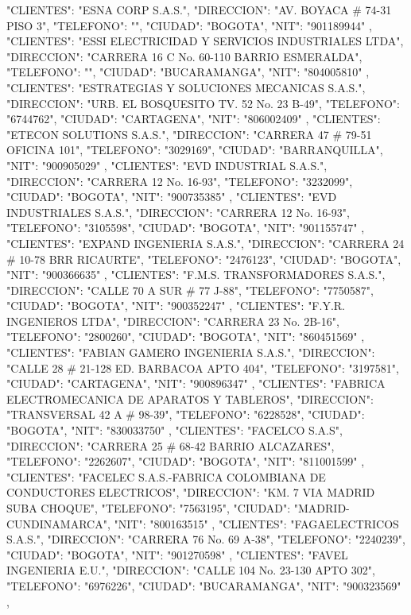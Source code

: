    {
   "CLIENTES": "ESNA CORP S.A.S.",
   "DIRECCION": "AV. BOYACA # 74-31 PISO 3",
   "TELEFONO": "",
   "CIUDAD": "BOGOTA",
   "NIT": "901189944"
   },
   {
   "CLIENTES": "ESSI ELECTRICIDAD Y SERVICIOS INDUSTRIALES LTDA",
   "DIRECCION": "CARRERA 16 C No. 60-110 BARRIO ESMERALDA",
   "TELEFONO": "",
   "CIUDAD": "BUCARAMANGA",
   "NIT": "804005810"
   },
   {
   "CLIENTES": "ESTRATEGIAS Y SOLUCIONES MECANICAS S.A.S.",
   "DIRECCION": "URB. EL BOSQUESITO TV. 52 No. 23 B-49",
   "TELEFONO": "6744762",
   "CIUDAD": "CARTAGENA",
   "NIT": "806002409"
   },
   {
   "CLIENTES": "ETECON SOLUTIONS S.A.S.",
   "DIRECCION": "CARRERA 47 # 79-51 OFICINA 101",
   "TELEFONO": "3029169",
   "CIUDAD": "BARRANQUILLA",
   "NIT": "900905029"
   },
   {
   "CLIENTES": "EVD INDUSTRIAL S.A.S.",
   "DIRECCION": "CARRERA 12 No. 16-93",
   "TELEFONO": "3232099",
   "CIUDAD": "BOGOTA",
   "NIT": "900735385"
   },
   {
   "CLIENTES": "EVD INDUSTRIALES S.A.S.",
   "DIRECCION": "CARRERA 12 No. 16-93",
   "TELEFONO": "3105598",
   "CIUDAD": "BOGOTA",
   "NIT": "901155747"
   },
   {
   "CLIENTES": "EXPAND INGENIERIA S.A.S.",
   "DIRECCION": "CARRERA 24 # 10-78 BRR RICAURTE",
   "TELEFONO": "2476123",
   "CIUDAD": "BOGOTA",
   "NIT": "900366635"
   },
   {
   "CLIENTES": "F.M.S. TRANSFORMADORES S.A.S.",
   "DIRECCION": "CALLE 70 A SUR # 77 J-88",
   "TELEFONO": "7750587",
   "CIUDAD": "BOGOTA",
   "NIT": "900352247"
   },
   {
   "CLIENTES": "F.Y.R. INGENIEROS LTDA",
   "DIRECCION": "CARRERA 23 No. 2B-16",
   "TELEFONO": "2800260",
   "CIUDAD": "BOGOTA",
   "NIT": "860451569"
   },
   {
   "CLIENTES": "FABIAN GAMERO INGENIERIA S.A.S.",
   "DIRECCION": "CALLE 28 # 21-128 ED. BARBACOA APTO 404",
   "TELEFONO": "3197581",
   "CIUDAD": "CARTAGENA",
   "NIT": "900896347"
   },
   {
   "CLIENTES": "FABRICA ELECTROMECANICA DE APARATOS Y TABLEROS",
   "DIRECCION": "TRANSVERSAL 42 A # 98-39",
   "TELEFONO": "6228528",
   "CIUDAD": "BOGOTA",
   "NIT": "830033750"
   },
   {
   "CLIENTES": "FACELCO S.A.S",
   "DIRECCION": "CARRERA 25 # 68-42 BARRIO ALCAZARES",
   "TELEFONO": "2262607",
   "CIUDAD": "BOGOTA",
   "NIT": "811001599"
   },
   {
   "CLIENTES": "FACELEC S.A.S.-FABRICA COLOMBIANA DE CONDUCTORES ELECTRICOS",
   "DIRECCION": "KM. 7 VIA MADRID SUBA CHOQUE",
   "TELEFONO": "7563195",
   "CIUDAD": "MADRID-CUNDINAMARCA",
   "NIT": "800163515"
   },
   {
   "CLIENTES": "FAGAELECTRICOS S.A.S.",
   "DIRECCION": "CARRERA 76 No. 69 A-38",
   "TELEFONO": "2240239",
   "CIUDAD": "BOGOTA",
   "NIT": "901270598"
   },
   {
   "CLIENTES": "FAVEL INGENIERIA E.U.",
   "DIRECCION": "CALLE 104 No. 23-130 APTO 302",
   "TELEFONO": "6976226",
   "CIUDAD": "BUCARAMANGA",
   "NIT": "900323569"
   },

